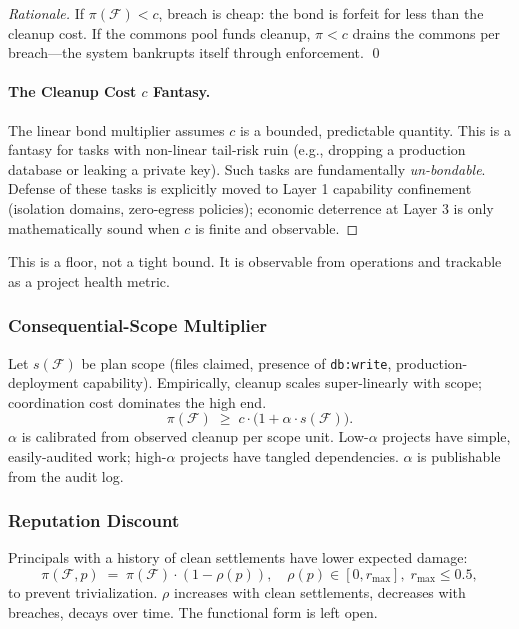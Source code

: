 \documentclass[11pt,a4paper]{article}
\theoremstyle{definition}
\theoremstyle{remark}
\begin{document}
\begin{proof}[Rationale]
If $\pi(\mathcal{F}) < c$, breach is cheap: the bond is forfeit for less than the cleanup cost. If the commons pool funds cleanup, $\pi < c$ drains the commons per breach---the system bankrupts itself through enforcement. \qed

\paragraph{The Cleanup Cost $c$ Fantasy.}
The linear bond multiplier assumes $c$ is a bounded, predictable quantity. This is a fantasy for tasks with non-linear tail-risk ruin (e.g., dropping a production database or leaking a private key). Such tasks are fundamentally \emph{un-bondable}. Defense of these tasks is explicitly moved to Layer 1 capability confinement (isolation domains, zero-egress policies); economic deterrence at Layer 3 is only mathematically sound when $c$ is finite and observable.
\end{proof}

This is a floor, not a tight bound. It is observable from operations and trackable as a project health metric.

\subsubsection{Consequential-Scope Multiplier}\label{sec:scope-multiplier}

Let $s(\mathcal{F})$ be plan scope (files claimed, presence of \texttt{db:write}, production-deployment capability). Empirically, cleanup scales super-linearly with scope; coordination cost dominates the high end.
\[
\pi(\mathcal{F}) \;\geq\; c \cdot \bigl(1 + \alpha \cdot s(\mathcal{F})\bigr).
\]
$\alpha$ is calibrated from observed cleanup per scope unit. Low-$\alpha$ projects have simple, easily-audited work; high-$\alpha$ projects have tangled dependencies. $\alpha$ is publishable from the audit log.

\subsubsection{Reputation Discount}\label{sec:rep-discount}

Principals with a history of clean settlements have lower expected damage:
\[
\pi(\mathcal{F}, p) \;=\; \pi(\mathcal{F}) \cdot (1 - \rho(p)),
\quad \rho(p) \in [0, r_{\max}],\; r_{\max} \leq 0.5,
\]
to prevent trivialization. $\rho$ increases with clean settlements, decreases with breaches, decays over time. The functional form is left open.
\end{document}
